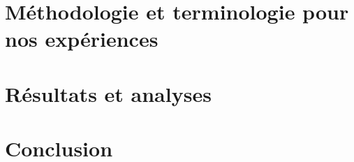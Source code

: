 \documentclass[utf8x]{article-hermes_frenchb}
\begin{document}
\section{Méthodologie et terminologie pour nos expériences}

\label{sec:Meth}
\section{Résultats et analyses}
\label{sec:expe}






\section{Conclusion}

\label{sec:concl}



\end{document}

